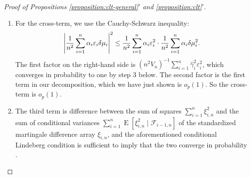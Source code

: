 \documentclass{article}
\DeclarePairedDelimiter\abs{\lvert}{\rvert}
\theoremstyle{definition}
\DeclareMathOperator{\E}{E}
\newcommand{\dm}{\delta \mu}
\newcommand{\hgamma}{\ensuremath{\hat\gamma}}
\newcommand{\<}{\langle}
\renewcommand{\>}{\rangle}
\begin{document}
\begin{refsection}
\begin{proof}[Proof of Propositions \ref{proposition:clt-general}$'$ and \ref{proposition:clt}$'$]
\begin{enumerate}
\item For the cross-term, we use the Cauchy-Schwarz inequality:
\[
\abs*{\frac{1}{n^2}\sum_{i=1}^n \alpha_i \varepsilon_i \dm_i}^2 \le \frac{1}{n^2}\sum_{i=1}^n \alpha_i \varepsilon_i^2 \cdot \frac{1}{n^2}\sum_{i=1}^n \alpha_i \dm_i^2.
\]
The first factor on the right-hand side is $(n^2 V_n)^{-1}\sum_{i=1}^n \hgamma_i^2 \varepsilon_i^2$, which converges in probability to one by step 3 below. The second factor is the first term in our decomposition, which we have just shown is $o_p(1)$. So the cross-term is $o_p(1)$.
\item The third term is difference between the sum of squares $\sum_{i=1}^n \xi_{i,n}^2$ and the sum of conditional variances $\sum_{i=1}^n \E[\xi_{i,n}^2 \mid \mathcal{F}_{i-1,n}]$ of the standardized martingale difference array $\xi_{i,n}$, and the aforementioned conditional Lindeberg condition is sufficient to imply that the two converge in probability \citep[Theorem 2.23]{hall2014martingale}.
\end{enumerate}
\end{proof}




\end{refsection}
\end{document}
